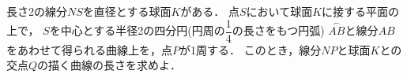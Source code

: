 \documentclass[../../main.tex]{subfiles}
\begin{document}
長さ2の線分$NS$を直径とする球面$K$がある．
点$S$において球面$K$に接する平面の上で，
$S$を中心とする半径2の四分円(円周の$\displaystyle\dfrac{1}{4}$の長さをもつ円弧)
$\stackrel{\frown}{AB}$と線分$AB$をあわせて得られる曲線上を，点$P$が1周する．
このとき，線分$NP$と球面$K$との交点$Q$の描く曲線の長さを求めよ．
\end{document}
